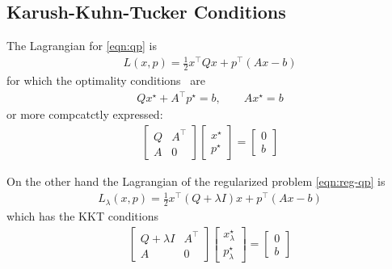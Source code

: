 \documentclass[12pt]{article}
\begin{document}
\subsection{Karush-Kuhn-Tucker Conditions}
The Lagrangian for \eqref{eqn:qp} is
\begin{align*}
  L(x, p) = \frac{1}{2} x^\top Q x + p^\top (Ax - b)
\end{align*}
for which the
optimality conditions~\cite{boyd2004convex} are
\begin{align*}
  Q x^\star + A^\top p^\star = b,
    \qquad Ax^\star = b
\end{align*}
or more compcatctly expressed:
\begin{align}
  \begin{bmatrix} Q & A^\top \\ A & 0 \end{bmatrix}
  \begin{bmatrix} x^\star \\ p^\star \end{bmatrix}
  = \begin{bmatrix} 0 \\ b \end{bmatrix}
    \label{eqn:kkt-qp}
\end{align}

On the other hand the Lagrangian of the
regularized problem \eqref{eqn:reg-qp} is
\begin{align*}
  L_\lambda (x, p) = \frac{1}{2} x^\top (Q + \lambda I) x + p^\top (Ax - b)
\end{align*}
which has the KKT conditions
\begin{align}
  \begin{bmatrix} Q + \lambda I & A^\top \\ A & 0 \end{bmatrix}
  \begin{bmatrix} x_\lambda ^\star \\ p_\lambda ^\star \end{bmatrix}
    = \begin{bmatrix} 0 \\ b \end{bmatrix}
    \label{eqn:kkt-reg-qp}
\end{align}
\end{document}
